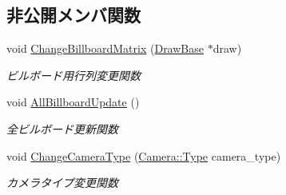 \subsection*{非公開メンバ関数}
\begin{DoxyCompactItemize}
\item 
void \mbox{\hyperlink{class_render_target_shadow_map_aad78575f0b78dad8e3bacc00d43cce8f}{Change\+Billboard\+Matrix}} (\mbox{\hyperlink{class_draw_base}{Draw\+Base}} $\ast$draw)
\begin{DoxyCompactList}\small\item\em ビルボード用行列変更関数 \end{DoxyCompactList}\item 
void \mbox{\hyperlink{class_render_target_shadow_map_a695f696fd3fed4991b79c49c082dbc3e}{All\+Billboard\+Update}} ()
\begin{DoxyCompactList}\small\item\em 全ビルボード更新関数 \end{DoxyCompactList}\item 
void \mbox{\hyperlink{class_render_target_shadow_map_a669ba6344e84fba605983c827fb1dc69}{Change\+Camera\+Type}} (\mbox{\hyperlink{class_camera_a3b0a1f58deca679ac665f61c480d1dcb}{Camera\+::\+Type}} camera\+\_\+type)
\begin{DoxyCompactList}\small\item\em カメラタイプ変更関数 \end{DoxyCompactList}\end{DoxyCompactItemize}

